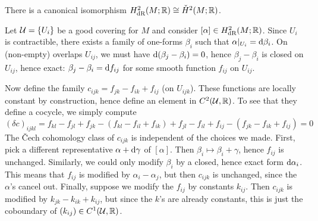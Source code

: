 \documentclass[parskip=half]{scrartcl}
\begin{document}
\begin{prop}\label{prop:dRCech}
	There is a canonical isomorphism $H^2_\text{dR}(M;\mathbb{R})\cong \check H^2(M;\mathbb{R})$.
\end{prop}
\begin{myproof}
	Let $\mathcal{U}=\{U_i\}$ be a good covering for $M$ and consider $[\alpha]\in H^2_\text{dR}(M;\mathbb{R})$. Since $U_i$ is contractible, there exists a family of one-forms $\beta_i$ such that $\alpha|_{U_i}=\mathrm{d} \beta_i$. On (non-empty) overlaps $U_{ij}$, we must have $\mathrm{d}(\beta_j-\beta_i)=0$, hence $\beta_j-\beta_i$ is closed on $U_{ij}$, hence exact: $\beta_j-\beta_i=\mathrm{d} f_{ij}$ for some smooth function $f_{ij}$ on $U_{ij}$.
	
	Now define the family $c_{ijk}=f_{jk}-f_{ik}+f_{ij}$ (on $U_{ijk}$). These functions are locally constant by construction, hence define an element in $C^2(\mathcal{U},\mathbb{R})$. To see that they define a cocycle, we simply compute
	\begin{equation*}
		(\delta c)_{ijkl}=f_{kl}-f_{jl}+f_{jk}
		-(f_{kl}-f_{il}+f_{ik})
		+f_{jl}-f_{il}+f_{ij}
		-(f_{jk}-f_{ik}+f_{ij})=0
	\end{equation*}
	The \v{C}ech cohomology class of $c_{ijk}$ is independent of the choices we made. First, pick a different representative $\alpha+\mathrm{d} \gamma$ of $[\alpha]$. Then $\beta_i\mapsto \beta_i+\gamma$, hence $f_{ij}$ is unchanged. Similarly, we could only modify $\beta_i$ by a closed, hence exact form $\mathrm{d}\alpha_i$. This means that $f_{ij}$ is modified by $\alpha_i-\alpha_j$, but then $c_{ijk}$ is unchanged, since the $\alpha$'s cancel out. Finally, suppose we modify the $f_{ij}$ by constants $k_{ij}$. Then $c_{ijk}$ is modified by $k_{jk}-k_{ik}+k_{ij}$, but since the $k$'s are already constants, this is just the coboundary of $(k_{ij})\in C^1(\mathcal{U},\mathbb{R})$.
	

\end{myproof}
\end{document}
